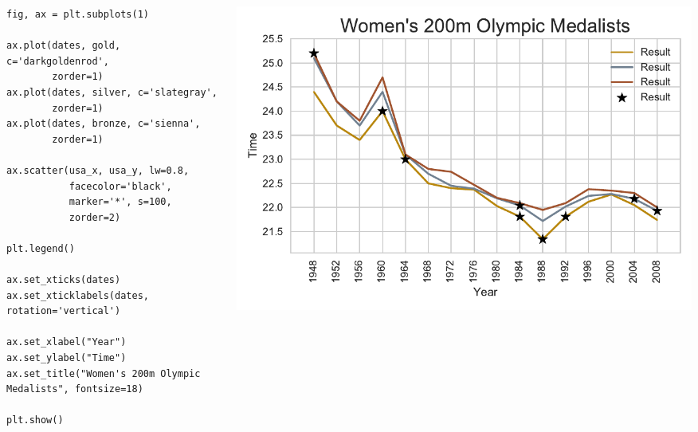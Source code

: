 \documentclass{beamer}
\begin{document}
\begin{frame}[fragile]
\tiny{
\begin{columns}
\begin{column}{0.45\textwidth}
\begin{verbatim}
fig, ax = plt.subplots(1)

ax.plot(dates, gold, c='darkgoldenrod',
        zorder=1)
ax.plot(dates, silver, c='slategray',
        zorder=1)
ax.plot(dates, bronze, c='sienna',
        zorder=1)

ax.scatter(usa_x, usa_y, lw=0.8,
           facecolor='black',
           marker='*', s=100,
           zorder=2)

plt.legend()

ax.set_xticks(dates)
ax.set_xticklabels(dates, rotation='vertical')

ax.set_xlabel("Year")
ax.set_ylabel("Time")
ax.set_title("Women's 200m Olympic Medalists", fontsize=18)

plt.show()
\end{verbatim}
\end{column}
\begin{column}{0.55\textwidth}
\includegraphics[width=\textwidth]{../olympics_7.pdf}
\end{column}
\end{columns}
}
\end{frame}
\end{document}
